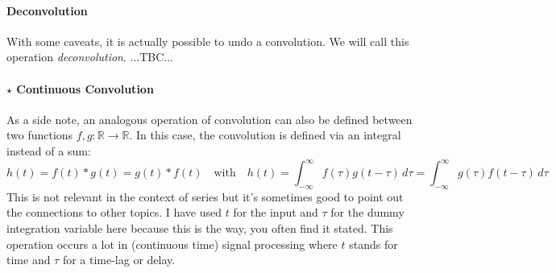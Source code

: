 


\paragraph{Deconvolution}
With some caveats, it is actually possible to undo a convolution. We will call this operation \emph{deconvolution}. ...TBC...



\paragraph{$\star$ Continuous Convolution}
As a side note, an analogous operation of convolution can also be defined between two functions $f,g: \mathbb{R} \rightarrow \mathbb{R}$. In this case, the convolution is defined via an integral instead of a sum:
\begin{equation}
 h(t) = f(t) \ast g(t) = g(t) \ast f(t) \quad \text{with} \quad
 h(t) = \int_{-\infty}^{\infty} f(\tau) g(t-\tau) \, d \tau 
      = \int_{-\infty}^{\infty} g(\tau) f(t-\tau) \, d \tau
\end{equation}
This is not relevant in the context of series but it's sometimes good to point out the connections to other topics. I have used $t$ for the input and $\tau$ for the dummy integration variable here because this is the way, you often find it stated. This operation occurs a lot in (continuous time) signal processing where $t$ stands for time and $\tau$ for a time-lag or delay.

